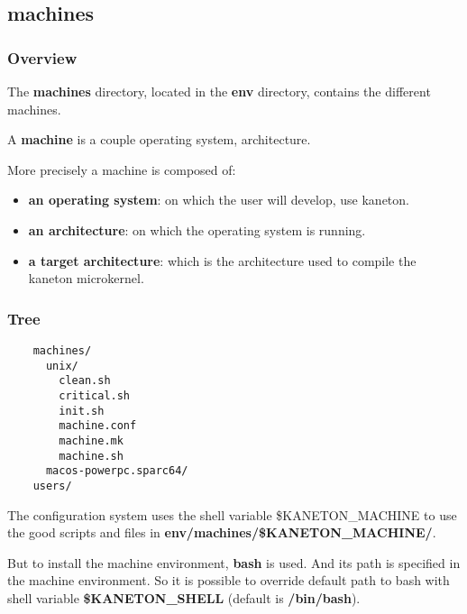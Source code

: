 %
%

\subsection{machines}


\begin{frame}
  \frametitle{Overview}

  The \textbf{machines} directory, located in the \textbf{env} directory,
  contains the different machines.

  \nl

  A \textbf{machine} is a couple operating system, architecture.

  \nl

  More precisely a machine is composed of:

  \begin{itemize}[<+->]
    \item
      \textbf{an operating system}: on which the user will develop,
      use kaneton.
    \item
      \textbf{an architecture}: on which the operating system
      is running.
    \item
      \textbf{a target architecture}: which is the architecture used
      to compile the kaneton microkernel.
  \end{itemize}
\end{frame}


\begin{frame}[containsverbatim]
  \frametitle{Tree}

  \begin{verbatim}
    machines/
      unix/
        clean.sh
        critical.sh
        init.sh
        machine.conf
        machine.mk
        machine.sh
      macos-powerpc.sparc64/
    users/
  \end{verbatim}

  The configuration system uses the shell variable \$KANETON\_MACHINE to
  use the good scripts and files in \textbf{env/machines/\$KANETON\_MACHINE/}.

  \nl

  But to install the machine environment, \textbf{bash} is used. And its
  path is specified in the machine environment. So it is possible to override
  default path to bash with shell variable \textbf{\$KANETON\_SHELL} (default
  is \textbf{/bin/bash}).
\end{frame}

